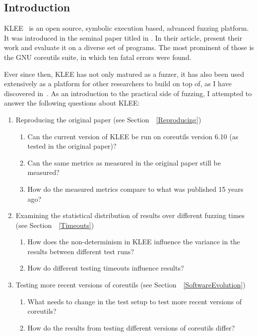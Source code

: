 \documentclass{article}
\let\savedCite=\cite
\renewcommand{\cite}{\unskip~\savedCite}
\let\savedRef=\ref
\renewcommand{\ref}{\unskip~\savedRef}
\begin{document}
\begin{multicols}{2}
    \tableofcontents


    \section{Introduction}
    KLEE\cite{KLEEWebsite} is an open source, symbolic execution based, advanced fuzzing platform. It was introduced in the seminal paper titled  in \citeyear{KLEE}. In their article, \citeauthor{KLEE} present their work and evaluate it on a diverse set of programs. The most prominent of those is the GNU coreutils suite, in which ten fatal errors were found.

    Ever since then, KLEE has not only matured as a fuzzer, it has also been used extensively as a platform for other researchers to build on top of, as I have discovered in\cite{EVA}. As an introduction to the practical side of fuzzing, I attempted to answer the following questions about KLEE:

    \begin{enumerate}
        \item Reproducing the original paper (see Section~\ref{Reproducing})
              \begin{enumerate}
                  \item Can the current version of KLEE be run on coreutils version 6.10 (as tested in the original paper)?
                  \item Can the same metrics as measured in the original paper still be measured?
                  \item How do the measured metrics compare to what was published 15 years ago?
              \end{enumerate}
        \item Examining the statistical distribution of results over different fuzzing times (see Section~\ref{Timeouts})
              \begin{enumerate}
                  \item How does the non-determinism in KLEE influence the variance in the results between different test runs?
                  \item How do different testing timeouts influence results?
              \end{enumerate}
        \item Testing more recent versions of coreutils (see Section~\ref{SoftwareEvolution})
              \begin{enumerate}
                  \item What needs to change in the test setup to test more recent versions of coreutils?
                  \item How do the results from testing different versions of coreutils differ?
              \end{enumerate}
    \end{enumerate}


\end{multicols}
\end{document}

